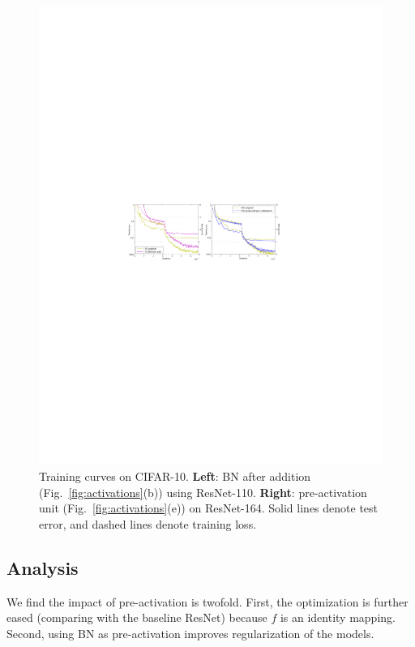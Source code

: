 \documentclass[runningheads]{llncs}
\begin{document}
\begin{figure}[t]
\centering
\includegraphics[width=0.99\linewidth]{eps/curves_act}
\caption{Training curves on CIFAR-10. \textbf{Left}: BN after addition (Fig.~\ref{fig:activations}(b)) using ResNet-110. \textbf{Right}: pre-activation unit (Fig.~\ref{fig:activations}(e)) on ResNet-164. Solid lines denote test error, and dashed lines denote training loss.
}
\label{fig:curves_act}
\end{figure}

\subsection{Analysis}

We find the impact of pre-activation is twofold. First, the optimization is further eased (comparing with the baseline ResNet) because $f$ is an identity mapping. Second, using BN as pre-activation improves regularization of the models.
\end{document}
